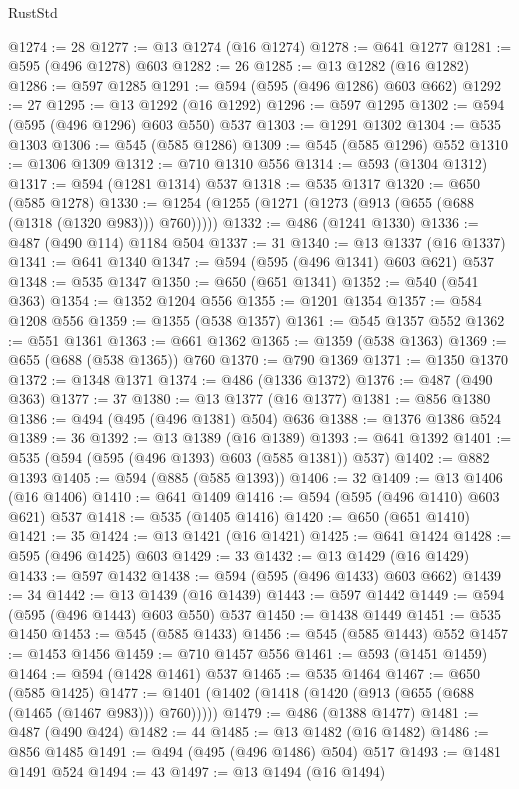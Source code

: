\begin{lexlean}{RustStd}
\begin{coremodule}
@1274 := 28
@1277 := @13 @1274 (@16 @1274)
@1278 := @641 @1277
@1281 := @595 (@496 @1278) @603
@1282 := 26
@1285 := @13 @1282 (@16 @1282)
@1286 := @597 @1285
@1291 := @594 (@595 (@496 @1286) @603 @662)
@1292 := 27
@1295 := @13 @1292 (@16 @1292)
@1296 := @597 @1295
@1302 := @594 (@595 (@496 @1296) @603 @550) @537
@1303 := @1291 @1302
@1304 := @535 @1303
@1306 := @545 (@585 @1286)
@1309 := @545 (@585 @1296) @552
@1310 := @1306 @1309
@1312 := @710 @1310 @556
@1314 := @593 (@1304 @1312)
@1317 := @594 (@1281 @1314) @537
@1318 := @535 @1317
@1320 := @650 (@585 @1278)
@1330 := @1254 (@1255 (@1271 (@1273 (@913 (@655 (@688 (@1318 (@1320 @983))) @760)))))
@1332 := @486 (@1241 @1330)
@1336 := @487 (@490 @114) @1184 @504
@1337 := 31
@1340 := @13 @1337 (@16 @1337)
@1341 := @641 @1340
@1347 := @594 (@595 (@496 @1341) @603 @621) @537
@1348 := @535 @1347
@1350 := @650 (@651 @1341)
@1352 := @540 (@541 @363)
@1354 := @1352 @1204 @556
@1355 := @1201 @1354
@1357 := @584 @1208 @556
@1359 := @1355 (@538 @1357)
@1361 := @545 @1357 @552
@1362 := @551 @1361
@1363 := @661 @1362
@1365 := @1359 (@538 @1363)
@1369 := @655 (@688 (@538 @1365)) @760
@1370 := @790 @1369
@1371 := @1350 @1370
@1372 := @1348 @1371
@1374 := @486 (@1336 @1372)
@1376 := @487 (@490 @363)
@1377 := 37
@1380 := @13 @1377 (@16 @1377)
@1381 := @856 @1380
@1386 := @494 (@495 (@496 @1381) @504) @636
@1388 := @1376 @1386 @524
@1389 := 36
@1392 := @13 @1389 (@16 @1389)
@1393 := @641 @1392
@1401 := @535 (@594 (@595 (@496 @1393) @603 (@585 @1381)) @537)
@1402 := @882 @1393
@1405 := @594 (@885 (@585 @1393))
@1406 := 32
@1409 := @13 @1406 (@16 @1406)
@1410 := @641 @1409
@1416 := @594 (@595 (@496 @1410) @603 @621) @537
@1418 := @535 (@1405 @1416)
@1420 := @650 (@651 @1410)
@1421 := 35
@1424 := @13 @1421 (@16 @1421)
@1425 := @641 @1424
@1428 := @595 (@496 @1425) @603
@1429 := 33
@1432 := @13 @1429 (@16 @1429)
@1433 := @597 @1432
@1438 := @594 (@595 (@496 @1433) @603 @662)
@1439 := 34
@1442 := @13 @1439 (@16 @1439)
@1443 := @597 @1442
@1449 := @594 (@595 (@496 @1443) @603 @550) @537
@1450 := @1438 @1449
@1451 := @535 @1450
@1453 := @545 (@585 @1433)
@1456 := @545 (@585 @1443) @552
@1457 := @1453 @1456
@1459 := @710 @1457 @556
@1461 := @593 (@1451 @1459)
@1464 := @594 (@1428 @1461) @537
@1465 := @535 @1464
@1467 := @650 (@585 @1425)
@1477 := @1401 (@1402 (@1418 (@1420 (@913 (@655 (@688 (@1465 (@1467 @983))) @760)))))
@1479 := @486 (@1388 @1477)
@1481 := @487 (@490 @424)
@1482 := 44
@1485 := @13 @1482 (@16 @1482)
@1486 := @856 @1485
@1491 := @494 (@495 (@496 @1486) @504) @517
@1493 := @1481 @1491 @524
@1494 := 43
@1497 := @13 @1494 (@16 @1494)

\end{coremodule}
\end{lexlean}
